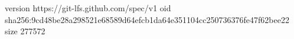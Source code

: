 version https://git-lfs.github.com/spec/v1
oid sha256:9cd48be28a298521e68589d64efcb1da64e351104cc250736376fe47f62bee22
size 277572
